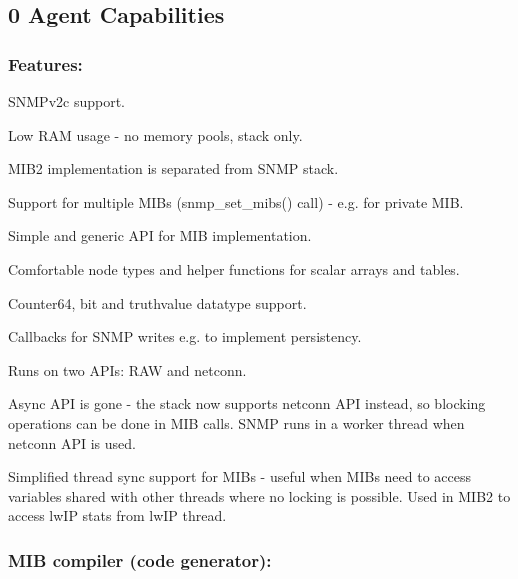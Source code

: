  \subsection*{0 Agent Capabilities }

\subsubsection*{Features\+: }


\begin{DoxyItemize}
\item S\+N\+M\+Pv2c support.
\item Low R\+AM usage -\/ no memory pools, stack only.
\item M\+I\+B2 implementation is separated from S\+N\+MP stack.
\item Support for multiple M\+I\+Bs (snmp\+\_\+set\+\_\+mibs() call) -\/ e.\+g. for private M\+IB.
\item Simple and generic A\+PI for M\+IB implementation.
\item Comfortable node types and helper functions for scalar arrays and tables.
\item Counter64, bit and truthvalue datatype support.
\item Callbacks for S\+N\+MP writes e.\+g. to implement persistency.
\item Runs on two A\+P\+Is\+: R\+AW and netconn.
\item Async A\+PI is gone -\/ the stack now supports netconn A\+PI instead, so blocking operations can be done in M\+IB calls. S\+N\+MP runs in a worker thread when netconn A\+PI is used.
\item Simplified thread sync support for M\+I\+Bs -\/ useful when M\+I\+Bs need to access variables shared with other threads where no locking is possible. Used in M\+I\+B2 to access lw\+IP stats from lw\+IP thread.
\end{DoxyItemize}

\subsubsection*{M\+IB compiler (code generator)\+: }


